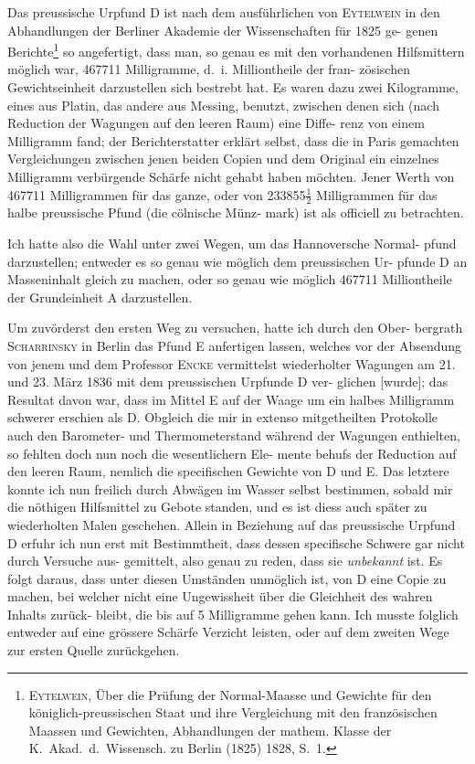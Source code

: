 \documentclass[12pt,a4paper]{article}
\theoremstyle{plain}
\theoremstyle{definition}
\theoremstyle{remark}
\begin{document}
Das preussische Urpfund D ist nach dem ausf\"uhrlichen von \textsc{Eytelwein}
in den Abhandlungen der Berliner Akademie der Wissenschaften f\"ur 1825 ge-
genen Berichte\footnote{\textsc{Eytelwein}, \"Uber die Pr\"ufung der Normal-Maasse und Gewichte
f\"ur den k\"oniglich-preussischen Staat und ihre Vergleichung mit den franz\"osischen
Maassen und Gewichten, Abhandlungen der mathem. Klasse der K.~Akad.~d.~Wissensch.
zu Berlin (1825) 1828, S.~1.} so angefertigt, dass man, so genau es mit den vorhandenen
Hilfsmittern m\"oglich war, 467711 Milligramme, d.~i. Milliontheile der fran-
z\"osischen Gewichtseinheit darzustellen sich bestrebt hat. Es waren dazu zwei
Kilogramme, eines aus Platin, das andere aus Messing, benutzt, zwischen
denen sich (nach Reduction der Wagungen auf den leeren Raum) eine Diffe-
renz von einem Milligramm fand; der Berichterstatter erkl\"art selbst, dass die
in Paris gemachten Vergleichungen zwischen jenen beiden Copien und dem
Original ein einzelnes Milligramm verb\"urgende Sch\"arfe nicht gehabt haben
m\"ochten. Jener Werth von 467711 Milligrammen f\"ur das ganze, oder von
233855$\frac{1}{2}$ Milligrammen f\"ur das halbe preussische Pfund (die c\"olnische M\"unz-
mark) ist als officiell zu betrachten.


Ich hatte also die Wahl unter zwei Wegen, um das Hannoversche Normal-
pfund darzustellen; entweder es so genau wie m\"oglich dem preussischen Ur-
pfunde D an Masseninhalt gleich zu machen, oder so genau wie m\"oglich
467711 Milliontheile der Grundeinheit A darzustellen.

Um zuv\"orderst den ersten Weg zu versuchen, hatte ich durch den Ober-
bergrath \textsc{Scharrinsky} in Berlin das Pfund E anfertigen lassen, welches vor
der Absendung von jenem und dem Professor \textsc{Encke} vermittelst wiederholter
Wagungen am 21. und 23. M\"arz 1836 mit dem preussischen Urpfunde D ver-
glichen [wurde]; das Resultat davon war, dass im Mittel E auf der Waage um
ein halbes Milligramm schwerer erschien als D. Obgleich die mir in extenso
mitgetheilten Protokolle auch den Barometer- und Thermometerstand w\"ahrend
 der Wagungen enthielten, so fehlten doch nun noch die wesentlichern Ele-
mente behufs der Reduction auf den leeren Raum, nemlich die specifischen
Gewichte von D und E. Das letztere konnte ich nun freilich durch Abw\"agen
im Wasser selbst bestimmen, sobald mir die n\"othigen Hilfsmittel zu Gebote
standen, und es ist diess auch sp\"ater zu wiederholten Malen geschehen.
Allein in Beziehung auf das preussische Urpfund D erfuhr ich nun erst mit
Bestimmtheit, dass dessen specifische Schwere gar nicht durch Versuche aus-
gemittelt, also genau zu reden, dass sie \textit{unbekannt} ist. Es folgt daraus, dass
unter diesen Umst\"anden unm\"oglich ist, von D eine Copie zu machen, bei
welcher nicht eine Ungewissheit \"uber die Gleichheit des wahren Inhalts zur\"uck-
bleibt, die bis auf 5 Milligramme gehen kann. Ich musste folglich entweder
auf eine gr\"ossere Sch\"arfe Verzicht leisten, oder auf dem zweiten Wege zur
ersten Quelle zur\"uckgehen.
\end{document}
